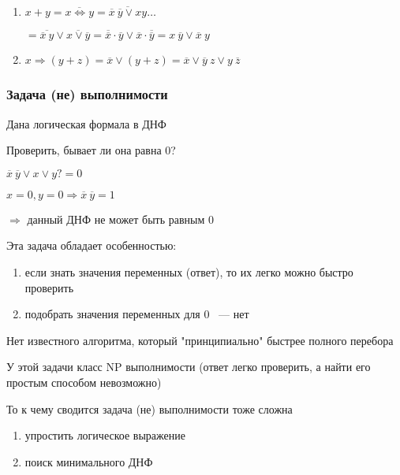 \documentclass[russian]{lecture-notes}
\begin{document}
\begin{sloppypar}
\begin{example}
\begin{enumerate}
                \item{ $x + y = \overline{x \Leftrightarrow y} = \overline{\overline{x} \: \overline{y} \lor xy} \dots$

                    $ = \overline{\overline{x} \: y} \lor \overline{x \lor \overline{y}} = \overline{\overline{x}} \cdot \overline{y} \lor \overline{x} \cdot \overline{\overline{y}} = x \: \overline{y} \lor \overline{x} \: y$
                }
                \item $x \Rightarrow (y + z) = \overline{x} \lor (y + z) = \overline{x} \lor \overline{y} \: z \lor y \: \overline{z}$
            \end{enumerate}
        \end{example}

        \subsubsection{Задача (не) выполнимости}

        Дана логическая формала в ДНФ

        Проверить, бывает ли она равна 0?

        $\overline{x} \: \overline{y} \lor x \lor y ?= 0$

        $x = 0, y = 0 \Rightarrow \overline{x} \: \overline{y} = 1$

        $\Rightarrow$ данный ДНФ не может быть равным 0

        Эта задача обладает особенностью:

        \begin{enumerate}
            \item если знать значения переменных (ответ), то их легко можно быстро проверить
            \item подобрать значения переменных для 0 ~--- нет
        \end{enumerate}

        Нет известного алгоритма, который "принципиально" быстрее полного перебора

        У этой задачи класс NP выполнимости (ответ легко проверить, а найти его простым способом невозможно)

        \begin{corollary}
            То к чему сводится задача (не) выполнимости тоже сложна
            \begin{enumerate}
                \item упростить логическое выражение
                \item поиск минимального ДНФ
            \end{enumerate}
        \end{corollary}


\end{sloppypar}
\end{document}
